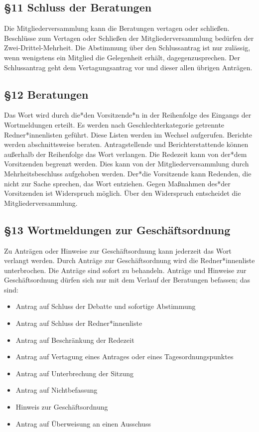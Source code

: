 \documentclass[12pt]{report}
\begin{document}
\begin{justify}
\subsection*{§11 Schluss der Beratungen}
Die Mitgliederversammlung kann die Beratungen vertagen oder schließen. Beschlüsse zum Vertagen oder
Schließen der Mitgliederversammlung bedürfen der Zwei-Drittel-Mehrheit. Die Abstimmung über den
Schlussantrag ist nur zulässig, wenn wenigstens ein Mitglied die Gelegenheit erhält, dagegenzusprechen.
Der Schlussantrag geht dem Vertagungsantrag vor und dieser allen übrigen Anträgen.
\subsection*{§12 Beratungen}
Das Wort wird durch die*den Vorsitzende*n in der Reihenfolge des Eingangs der Wortmeldungen erteilt.
Es werden nach Geschlechterkategorie getrennte Redner*innenlisten geführt. Diese Listen werden im Wechsel aufgerufen. Berichte werden
abschnittsweise beraten. Antragstellende und Berichterstattende können außerhalb der Reihenfolge das
Wort verlangen. Die Redezeit kann von der*dem Vorsitzenden begrenzt werden. Dies kann von der 
Mitgliederversammlung durch Mehrheitsbeschluss aufgehoben werden. Der*die Vorsitzende kann Redenden, die
nicht zur Sache sprechen, das Wort entziehen. Gegen Maßnahmen des*der Vorsitzenden ist Widerspruch
möglich. Über den Widerspruch entscheidet die Mitgliederversammlung.
\subsection*{§13 Wortmeldungen zur Geschäftsordnung}
Zu Anträgen oder Hinweise zur Geschäftsordnung kann jederzeit das Wort verlangt werden. Durch Anträge
zur Geschäftsordnung wird die Redner*innenliste unterbrochen. Die Anträge sind sofort zu behandeln. Anträge und
Hinweise zur Geschäftsordnung dürfen sich nur mit dem Verlauf der Beratungen befassen; das sind:

\begin{itemize}
  \item Antrag auf Schluss der Debatte und sofortige Abstimmung
  \item Antrag auf Schluss der Redner*innenliste
  \item Antrag auf Beschränkung der Redezeit
  \item Antrag auf Vertagung eines Antrages oder eines Tagesordnungspunktes
  \item Antrag auf Unterbrechung der Sitzung
  \item Antrag auf Nichtbefassung
  \item Hinweis zur Geschäftsordnung
  \item Antrag auf Überweisung an einen Ausschuss
\end{itemize}


\end{justify}
\end{document}
